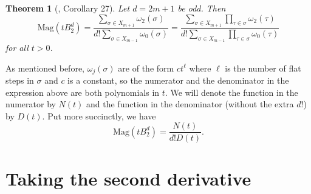 \documentclass[11pt]{article}
\theoremstyle{definition}
\theoremstyle{definition}
\theoremstyle{plain}
\newtheorem{theo}{Theorem}
\theoremstyle{plain}
\theoremstyle{plain}
\theoremstyle{definition}
\begin{document}
\begin{theo}[\cite{willerton_magnitude_2017}, Corollary 27]
Let $d = 2m+1$ be odd. Then
\begin{equation*}
\text{Mag}\left(tB_2^d\right) = \frac{\sum\limits_{\sigma\in X_{m+1}}\omega_2(\sigma)}{d!\sum\limits_{\sigma\in X_{m-1}}\omega_0(\sigma)} = \frac{\sum\limits_{\sigma\in X_{m+1}}\prod\limits_{\tau\in\sigma}\omega_2(\tau)}{d!\sum\limits_{\sigma\in X_{m-1}}\prod\limits_{\tau\in\sigma}\omega_0(\tau)}
\end{equation*}
for all $t > 0$.
\end{theo}
As mentioned before, $\omega_j(\sigma)$ are of the form $ct^\ell$ where $\ell$ is the number of flat steps in $\sigma$ and $c$ is a constant, so the numerator and the denominator in the expression above are both polynomials in $t$. We will denote the function in the numerator by $N(t)$ and the function in the denominator (without the extra $d!$) by $D(t)$. Put more succinctly, we have
\begin{equation*}
\text{Mag}\left(tB_2^d\right) = \frac{N(t)}{d!D(t)}.
\end{equation*}

\section{Taking the second derivative}
\end{document}
